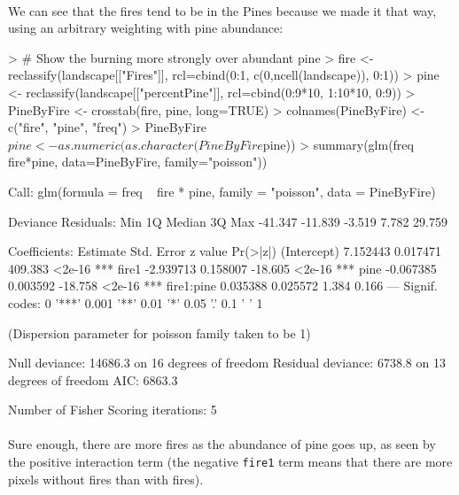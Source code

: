 \documentclass{article}
\begin{document}
\paragraph{}
We can see that the fires tend to be in the Pines because we made it that way, using an arbitrary weighting with pine abundance:

\begin{Schunk}
\begin{Sinput}
> # Show the burning more strongly over abundant pine
> fire <- reclassify(landscape[["Fires"]], rcl=cbind(0:1, c(0,ncell(landscape)), 0:1))
> pine <- reclassify(landscape[["percentPine"]], rcl=cbind(0:9*10, 1:10*10, 0:9))
> PineByFire <- crosstab(fire, pine, long=TRUE)
> colnames(PineByFire) <- c("fire", "pine", "freq")
> PineByFire$pine <- as.numeric(as.character(PineByFire$pine))
> summary(glm(freq ~ fire*pine, data=PineByFire, family="poisson"))
\end{Sinput}
\begin{Soutput}
Call:
glm(formula = freq ~ fire * pine, family = "poisson", data = PineByFire)

Deviance Residuals: 
    Min       1Q   Median       3Q      Max  
-41.347  -11.839   -3.519    7.782   29.759  

Coefficients:
             Estimate Std. Error z value Pr(>|z|)    
(Intercept)  7.152443   0.017471 409.383   <2e-16 ***
fire1       -2.939713   0.158007 -18.605   <2e-16 ***
pine        -0.067385   0.003592 -18.758   <2e-16 ***
fire1:pine   0.035388   0.025572   1.384    0.166    
---
Signif. codes:  0 '***' 0.001 '**' 0.01 '*' 0.05 '.' 0.1 ' ' 1

(Dispersion parameter for poisson family taken to be 1)

    Null deviance: 14686.3  on 16  degrees of freedom
Residual deviance:  6738.8  on 13  degrees of freedom
AIC: 6863.3

Number of Fisher Scoring iterations: 5
\end{Soutput}
\end{Schunk}

\paragraph{}
Sure enough, there are more fires as the abundance of pine goes up, as seen by the positive interaction term (the negative \texttt{fire1} term means that there are more pixels without fires than with fires).
\end{document}
